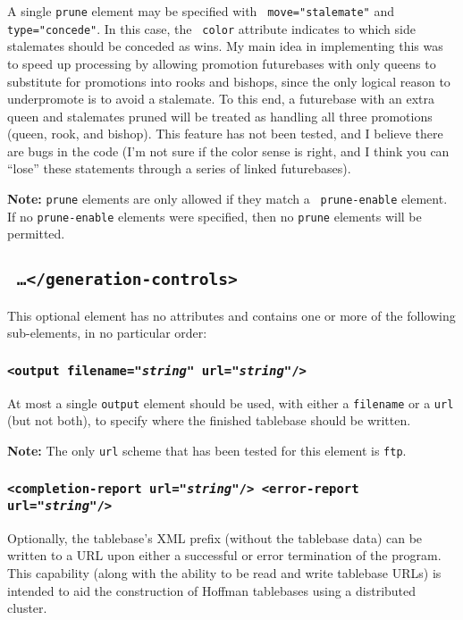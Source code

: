 \documentclass[11pt]{article}
\begin{document}
A single {\tt prune} element may be specified with {\tt
move="stalemate"} and {\tt type="concede"}.  In this case, the {\tt
color} attribute indicates to which side stalemates should be conceded
as wins.  My main idea in implementing this was to speed up processing
by allowing promotion futurebases with only queens to substitute for
promotions into rooks and bishops, since the only logical reason to
underpromote is to avoid a stalemate.  To this end, a futurebase with
an extra queen and stalemates pruned will be treated as handling all
three promotions (queen, rook, and bishop).  This feature has not been
tested, and I believe there are bugs in the code (I'm not sure if the
color sense is right, and I think you can ``lose'' these statements
through a series of linked futurebases).

{\bf Note:} {\tt prune} elements are only allowed if they match a {\tt
prune-enable} element.  If no {\tt prune-enable} elements were
specified, then no {\tt prune} elements will be permitted.

\subsection{\tt <generation-controls> \ldots\qquad </generation-controls>}

This optional element has no attributes and contains one or more
of the following sub-elements, in no particular order:

\subsubsection{\tt <output filename="{\it string}" url="{\it string}"/>}

At most a single {\tt output} element should be used, with either a
{\tt filename} or a {\tt url} (but not both), to specify where
the finished tablebase should be written.

{\bf Note:} The only {\tt url} scheme that has been tested for this
element is {\tt ftp}.

\subsubsection{\tt <completion-report url="{\it string}"/> \hfil\break <error-report url="{\it string}"/>}

Optionally, the tablebase's XML prefix (without the tablebase data) can
be written to a URL upon either a successful or error termination of
the program.  This capability (along with the ability to be read and
write tablebase URLs) is intended to aid the construction of Hoffman
tablebases using a distributed cluster.
\end{document}
